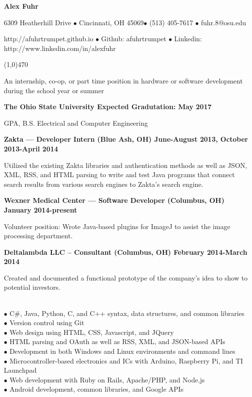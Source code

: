 \documentclass[10pt]{article}
\begin{document}
\centerline{{\LARGE \bf Alex Fuhr}}

\centerline{6309 Heatherhill Drive $\bullet$ Cincinnati, OH 45069$\bullet$ (513) 405-7617 $\bullet$ fuhr.8@osu.edu}
\centerline{http://afuhrtrumpet.github.io $\bullet$ Github: afuhrtrumpet $\bullet$ Linkedin: http://www.linkedin.com/in/alexfuhr}
\noindent
\line(1,0){470}\\

\smallskip

\noindent
An internship, co-op, or part time position in hardware or software development during the school year or summer
\bigskip

\smallskip

\centerline{{\large \bf The Ohio State University \hfill Expected Gradutation: May 2017}}
 GPA, B.S. Electrical and Computer Engineering
\bigskip

\smallskip

\centerline{{\large \bf Zakta --- Developer Intern (Blue Ash, OH) \hfill June-August 2013, October 2013-April 2014}}
\noindent
Utilized the existing Zakta libraries and authentication methods as well as JSON, XML, RSS, and HTML parsing to write and test Java programs that connect search results from various search engines to Zakta's search engine.

\centerline{{\large \bf Wexner Medical Center --- Software Developer (Columbus, OH) \hfill January 2014-present}}
\noindent
Volunteer position: Wrote Java-based plugins for ImageJ to assist the image processing department.

\centerline{{\large \bf Deltalambda LLC -- Consultant (Columbus, OH) \hfill February 2014-March 2014}}
\noindent
Created and documented a functional prototype of the company's idea to show to potential investors.
\bigskip

\\
\smallskip
$\bullet$ C\#, Java, Python, C, and C++ syntax, data structures, and common libraries\\
$\bullet$ Version control using Git\\
$\bullet$ Web design using HTML, CSS, Javascript, and JQuery\\
$\bullet$ HTML parsing and OAuth as well as RSS, XML, and JSON-based APIs\\
$\bullet$ Development in both Windows and Linux environments and command lines\\
$\bullet$ Microcontroller-based electronics and ICs with Arduino, Raspberry Pi, and TI Launchpad\\
$\bullet$ Web development with Ruby on Rails, Apache/PHP, and Node.js\\
$\bullet$ Android development, common libraries, and Google APIs
\bigskip
\end{document}
